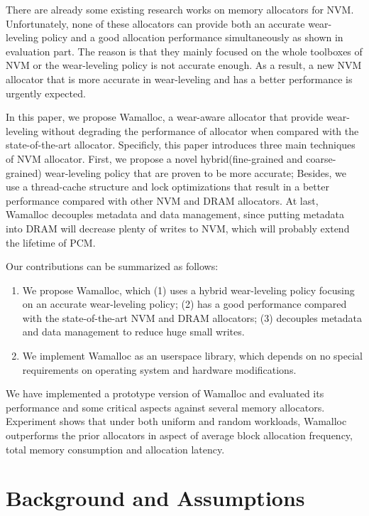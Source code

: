 \documentclass[10pt, conference, compsocconf]{IEEEtran}
\begin{document}
There are already some existing research works on memory allocators for NVM\cite{volos2011mnemosyne,coburn2011nv,moraru2013consistent}.
Unfortunately, none of these allocators can provide both an accurate wear-leveling policy
and a good allocation performance simultaneously as shown in evaluation part.
The reason is that they mainly focused on the whole toolboxes of NVM or the wear-leveling policy is not accurate enough.
As a result, a new NVM allocator that is more accurate in wear-leveling and has a better performance is urgently expected.

In this paper, we propose Wamalloc, 
a wear-aware allocator that provide wear-leveling without degrading the performance of allocator 
when compared with the state-of-the-art allocator. 
Specificly, this paper introduces three main techniques of NVM allocator.
First, we propose a novel hybrid(fine-grained and coarse-grained) wear-leveling policy that are proven to be more accurate;
Besides, we use a thread-cache structure and lock optimizations that result in a better performance 
compared with other NVM and DRAM allocators.
At last, Wamalloc decouples metadata and data management,
since putting metadata into DRAM will decrease plenty of writes to NVM, which will probably extend the lifetime of PCM.

Our contributions can be summarized as follows:
\begin{enumerate}
    \item We propose Wamalloc, which
        (1) uses a hybrid wear-leveling policy focusing on an accurate wear-leveling policy;
        (2) has a good performance compared with the state-of-the-art NVM and DRAM allocators;
        (3) decouples metadata and data management to reduce huge small writes.
    \item We implement Wamalloc as an userspace library, which depends on no special requirements on operating system and hardware modifications.
\end{enumerate}

We have implemented a prototype version of Wamalloc and 
evaluated its performance and some critical aspects against several memory allocators.
Experiment shows that under both uniform and random workloads, 
Wamalloc outperforms the prior allocators in aspect of average block allocation frequency, total memory consumption and allocation latency.


\section{Background and Assumptions}
\end{document}
